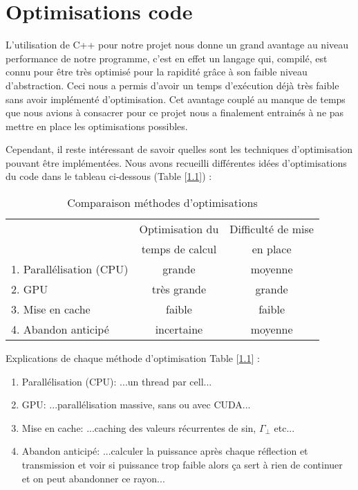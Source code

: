 \chapter{Optimisations code}
\label{chaper-5}





L'utilisation de C++ pour notre projet nous donne un grand avantage au niveau performance de notre programme, c'est en effet un langage qui, compilé, est connu pour être très optimisé pour la rapidité grâce à son faible niveau d'abstraction. Ceci nous a permis d'avoir un temps d'exécution déjà très faible sans avoir implémenté d'optimisation. Cet avantage couplé au manque de temps que nous avions à consacrer pour ce projet nous a finalement entrainés à ne pas mettre en place les optimisations possibles.

Cependant, il reste intéressant de savoir quelles sont les techniques d'optimisation pouvant être implémentées. Nous avons recueilli différentes idées d'optimisations du code dans le tableau ci-dessous (Table [\ref{tab:optimisation-table}]) :

\begin{table}[h]
    \centering
    \begin{tabular}{|l|c|c|}
        \hline
         & Optimisation du & Difficulté de mise \\
         & temps de calcul & en place \\
         \hline
         1. Parallélisation (CPU) & grande & moyenne \\
         2. GPU & très grande & grande \\
         3. Mise en cache & faible & faible \\
         4. Abandon anticipé & incertaine & moyenne \\
         \hline
    \end{tabular}
    \caption{Comparaison méthodes d'optimisations}
    \label{tab:optimisation-table}
\end{table}

Explications de chaque méthode d'optimisation Table [\ref{tab:optimisation-table}] :
\begin{enumerate}
    \item Parallélisation (CPU): ...un thread par cell...
    \item GPU: ...parallélisation massive, sans ou avec CUDA...
    \item Mise en cache: ...caching des valeurs récurrentes de sin, $\Gamma_\perp$ etc...
    \item  Abandon anticipé: ...calculer la puissance après chaque réflection et transmission et voir si puissance trop faible alors ça sert à rien de continuer et on peut abandonner ce rayon...
\end{enumerate}
